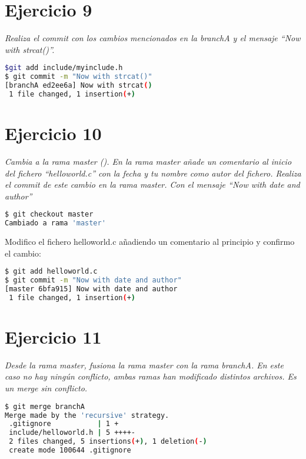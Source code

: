 \section{Ejercicio 9}
\begin{center}
    \parbox{12cm}{\justify\textit{
        Realiza el commit con los cambios mencionados en la branchA y el mensaje ``Now with strcat()''.
    }}
\end{center}
\begin{lstlisting}[xleftmargin=.16\textwidth,language=bash]
$git add include/myinclude.h
$ git commit -m "Now with strcat()"
[branchA ed2ee6a] Now with strcat()
 1 file changed, 1 insertion(+)
\end{lstlisting}

\section{Ejercicio 10}
\begin{center}
    \parbox{12cm}{\justify\textit{
        Cambia a la rama master (). En la rama master añade un comentario al inicio del fichero ``helloworld.c'' con la fecha y tu nombre como autor del fichero. Realiza el commit de este cambio en la rama master. Con el mensaje ``Now with date and author''
    }}
\end{center}
\begin{lstlisting}[xleftmargin=.16\textwidth,language=bash]
$ git checkout master
Cambiado a rama 'master'
\end{lstlisting}
Modifico el fichero helloworld.c añadiendo un comentario al principio y confirmo el cambio:
\begin{lstlisting}[xleftmargin=.16\textwidth,language=bash]
$ git add helloworld.c
$ git commit -m "Now with date and author"
[master 6bfa915] Now with date and author
 1 file changed, 1 insertion(+)
\end{lstlisting}

\section{Ejercicio 11}
\begin{center}
    \parbox{12cm}{\justify\textit{
        Desde la rama master, fusiona la rama master con la rama branchA. En este caso no hay ningún conflicto, ambas ramas han modificado distintos archivos. Es un merge sin conflicto.
    }}
\end{center}

\begin{lstlisting}[xleftmargin=.16\textwidth,language=bash]
$ git merge branchA
Merge made by the 'recursive' strategy.
 .gitignore           | 1 +
 include/helloworld.h | 5 ++++-
 2 files changed, 5 insertions(+), 1 deletion(-)
 create mode 100644 .gitignore
\end{lstlisting}

